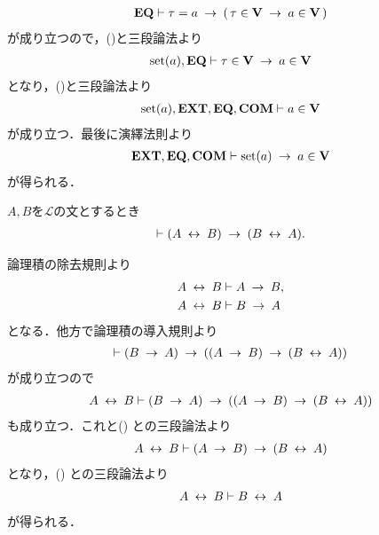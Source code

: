 \begin{prf}
\begin{align}
			\EQAX \vdash \tau = a \rarrow (\, \tau \in \Univ \rarrow a \in \Univ\, )
		\end{align}
		が成り立つので，()と三段論法より
		\begin{align}
			\set{a},\EQAX \vdash \tau \in \Univ \rarrow a \in \Univ
		\end{align}
		となり，()と三段論法より
		\begin{align}
			\set{a},\EXTAX,\EQAX,\COMAX \vdash a \in \Univ
		\end{align}
		が成り立つ．最後に演繹法則より
		\begin{align}
			\EXTAX,\EQAX,\COMAX \vdash \set{a} \rarrow a \in \Univ
		\end{align}
		が得られる．
		\QED
	\end{prf}
	
	\begin{screen}
		\begin{logicalthm}[同値関係の可換律]
		\label{logicalthm:commutative_law_of_equivalence_symbol}
			$A,B$を$\mathcal{L}$の文とするとき
			\begin{align}
				\vdash (A \lrarrow B) \rarrow (B \lrarrow A).
			\end{align}
		\end{logicalthm}
	\end{screen}
	
	\begin{sketch}
		論理積の除去規則より
		\begin{align}
			A \lrarrow B &\vdash A \rarrow B, 
			\label{fom:logicalthm_commutative_law_of_equivalence_symbol_1} \\
			A \lrarrow B &\vdash B \rarrow A
			\label{fom:logicalthm_commutative_law_of_equivalence_symbol_2}
		\end{align}
		となる．他方で論理積の導入規則より
		\begin{align}
			\vdash (B \rarrow A) \rarrow ((A \rarrow B) \rarrow (B \lrarrow A))
		\end{align}
		が成り立つので
		\begin{align}
			A \lrarrow B \vdash (B \rarrow A) \rarrow ((A \rarrow B) \rarrow (B \lrarrow A))
		\end{align}
		も成り立つ．これと()
		との三段論法より
		\begin{align}
			A \lrarrow B \vdash (A \rarrow B) \rarrow (B \lrarrow A)
		\end{align}
		となり，()
		との三段論法より
		\begin{align}
			A \lrarrow B \vdash B \lrarrow A
		\end{align}
		が得られる．
		\QED
	\end{sketch}
	
